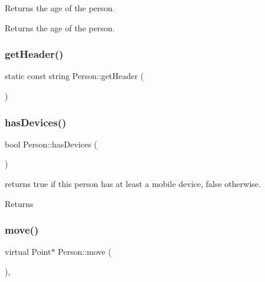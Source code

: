 Returns the age of the person. \begin{DoxyReturn}{Returns}
the age of the person. 
\end{DoxyReturn}
\mbox{\label{class_person_a6bebe59c354f26f4cb983185d6084181}} 
\subsubsection{\texorpdfstring{get\+Header()}{getHeader()}}
{\footnotesize\ttfamily static const string Person\+::get\+Header (\begin{DoxyParamCaption}{ }\end{DoxyParamCaption})\hspace{0.3cm}{\ttfamily [static]}}

\mbox{\label{class_person_a40d6f2c716dd3c9794067817a3fb9165}} 
\subsubsection{\texorpdfstring{has\+Devices()}{hasDevices()}}
{\footnotesize\ttfamily bool Person\+::has\+Devices (\begin{DoxyParamCaption}{ }\end{DoxyParamCaption})}

returns true if this person has at least a mobile device, false otherwise. \begin{DoxyReturn}{Returns}

\end{DoxyReturn}
\mbox{\label{class_person_a922e0462a1e7eac6523a9a864ce27afc}} 
\subsubsection{\texorpdfstring{move()}{move()}}
{\footnotesize\ttfamily virtual Point$\ast$ Person\+::move (\begin{DoxyParamCaption}{ }\end{DoxyParamCaption})\hspace{0.3cm}{\ttfamily [override]}, {\ttfamily [virtual]}}

